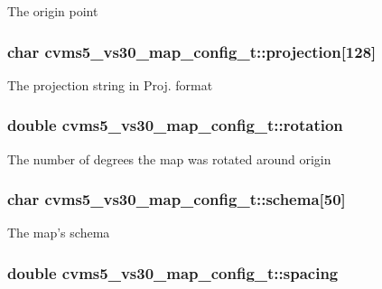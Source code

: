 The origin point \hypertarget{structcvms5__vs30__map__config__t_a37eb5ce940370c942f10dab9e14effa0}{
\subsubsection[{projection}]{\setlength{\rightskip}{0pt plus 5cm}char cvms5\+\_\+vs30\+\_\+map\+\_\+config\+\_\+t\+::projection\mbox{[}128\mbox{]}}}\label{structcvms5__vs30__map__config__t_a37eb5ce940370c942f10dab9e14effa0}
The projection string in Proj. format \hypertarget{structcvms5__vs30__map__config__t_ad313fa911aea273ec3c5adbb334590a8}{
\subsubsection[{rotation}]{\setlength{\rightskip}{0pt plus 5cm}double cvms5\+\_\+vs30\+\_\+map\+\_\+config\+\_\+t\+::rotation}}\label{structcvms5__vs30__map__config__t_ad313fa911aea273ec3c5adbb334590a8}
The number of degrees the map was rotated around origin \hypertarget{structcvms5__vs30__map__config__t_a186905cd6b487d3516adf5aefefe229d}{
\subsubsection[{schema}]{\setlength{\rightskip}{0pt plus 5cm}char cvms5\+\_\+vs30\+\_\+map\+\_\+config\+\_\+t\+::schema\mbox{[}50\mbox{]}}}\label{structcvms5__vs30__map__config__t_a186905cd6b487d3516adf5aefefe229d}
The map's schema \hypertarget{structcvms5__vs30__map__config__t_a9a84e5fbc499c465fc505bf090ac9cec}{
\subsubsection[{spacing}]{\setlength{\rightskip}{0pt plus 5cm}double cvms5\+\_\+vs30\+\_\+map\+\_\+config\+\_\+t\+::spacing}}\label{structcvms5__vs30__map__config__t_a9a84e5fbc499c465fc505bf090ac9cec}
